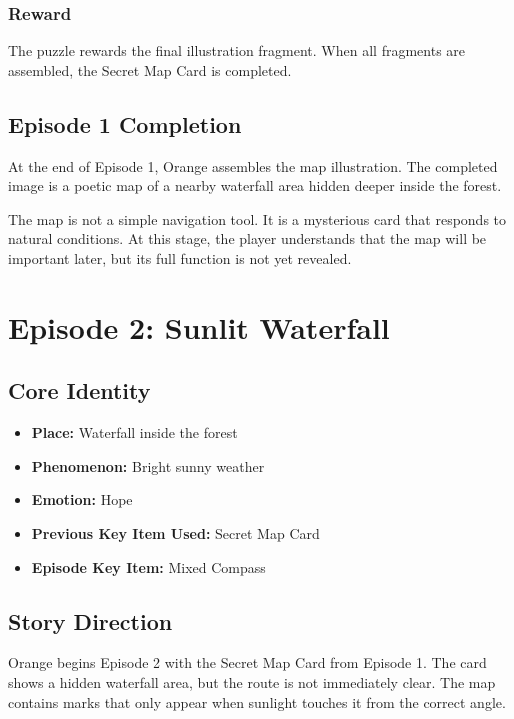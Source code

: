\documentclass[12pt]{article}
\begin{document}
\subsubsection{Reward}

The puzzle rewards the final illustration fragment. When all fragments are assembled, the Secret Map Card is completed.

\subsection{Episode 1 Completion}

At the end of Episode 1, Orange assembles the map illustration. The completed image is a poetic map of a nearby waterfall area hidden deeper inside the forest.

The map is not a simple navigation tool. It is a mysterious card that responds to natural conditions. At this stage, the player understands that the map will be important later, but its full function is not yet revealed.

\section{Episode 2: Sunlit Waterfall}

\subsection{Core Identity}

\begin{itemize}[leftmargin=*]
    \item \textbf{Place:} Waterfall inside the forest
    \item \textbf{Phenomenon:} Bright sunny weather
    \item \textbf{Emotion:} Hope
    \item \textbf{Previous Key Item Used:} Secret Map Card
    \item \textbf{Episode Key Item:} Mixed Compass
\end{itemize}

\subsection{Story Direction}

Orange begins Episode 2 with the Secret Map Card from Episode 1. The card shows a hidden waterfall area, but the route is not immediately clear. The map contains marks that only appear when sunlight touches it from the correct angle.
\end{document}
